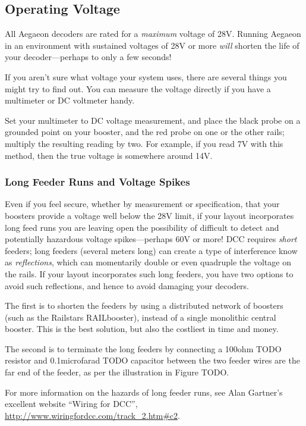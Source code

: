 \documentclass[12pt,letterpaper,draft]{memoir} %
\begin{document}
\subsection{Operating Voltage}

All Aegaeon decoders are rated for a \textit{maximum} voltage of 28V. Running Aegaeon in an environment with sustained voltages of 28V or more \textit{will} shorten the life of your decoder---perhaps to only a few seconds!

If you aren't sure what voltage your system uses, there are several things you might try to find out. You can measure the voltage directly if you have a multimeter or DC voltmeter handy.

Set your multimeter to DC voltage measurement, and place the black probe on a grounded point on your booster, and the red probe on one or the other rails; multiply the resulting reading by two. For example, if you read 7V with this method, then the true voltage is somewhere around 14V.

\subsubsection{Long Feeder Runs and Voltage Spikes}
Even if you feel secure, whether by measurement or specification, that your boosters provide a voltage well below the 28V limit, if your layout incorporates long feed runs you are leaving open the possibility of difficult to detect and potentially hazardous voltage spikes---perhaps 60V or more! DCC requires \textit{short} feeders; long feeders (several meters long) can create a type of interference know as \textit{reflections}, which can momentarily double or even quadruple the voltage on the rails. If your layout incorporates such long feeders, you have two options to avoid such reflections, and hence to avoid damaging your decoders.

The first is to shorten the feeders by using a distributed network of boosters (such as the Railstars RAILbooster), instead of a single monolithic central booster. This is the best solution, but also the costliest in time and money.

The second is to terminate the long feeders by connecting a 100ohm TODO resistor and 0.1microfarad TODO capacitor between the two feeder wires are the far end of the feeder, as per the illustration in Figure TODO.


For more information on the hazards of long feeder runs, see Alan Gartner's excellent website ``Wiring for DCC'', \url{http://www.wiringfordcc.com/track_2.htm#c2}.
\end{document}
